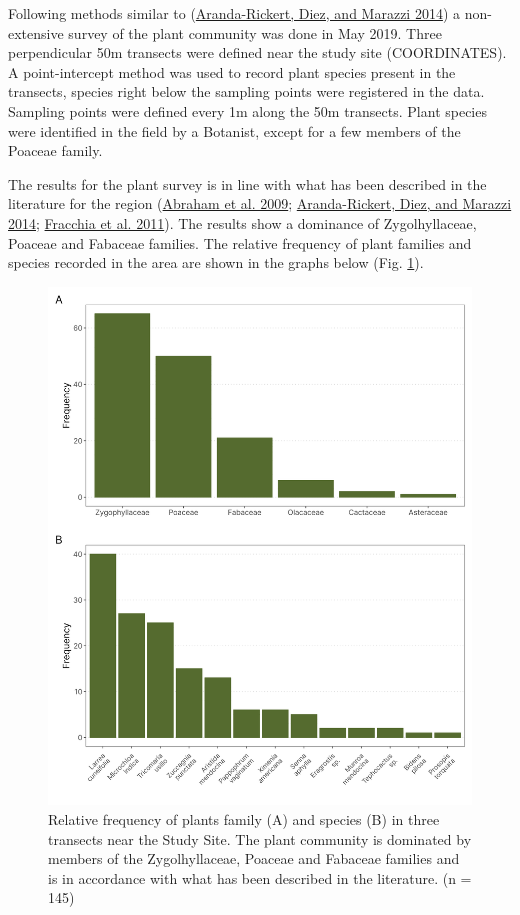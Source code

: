 \documentclass[english,msc,numbers,hidelinks]{coppe}
\begin{document}
  Following methods similar to (\protect\hyperlink{ref-aranda-rickert2014}{Aranda-Rickert, Diez, and Marazzi 2014}) a non-extensive survey of the plant community was done in May 2019. Three perpendicular 50m transects were defined near the study site (COORDINATES). A point-intercept method was used to record plant species present in the transects, species right below the sampling points were registered in the data. Sampling points were defined every 1m along the 50m transects. Plant species were identified in the field by a Botanist, except for a few members of the Poaceae family.

  The results for the plant survey is in line with what has been described in the literature for the region (\protect\hyperlink{ref-abraham2009}{Abraham et al. 2009}; \protect\hyperlink{ref-aranda-rickert2014}{Aranda-Rickert, Diez, and Marazzi 2014}; \protect\hyperlink{ref-fracchia2011}{Fracchia et al. 2011}). The results show a dominance of Zygolhyllaceae, Poaceae and Fabaceae families. The relative frequency of plant families and species recorded in the area are shown in the graphs below (Fig. \ref{fig:appendix-plants}).
  \begin{figure}

  {\centering \includegraphics[width=1\linewidth]{../04_figures/appendix/plot_plants} 

  }

  \caption{Relative frequency of plants family (A) and species (B) in three transects near the Study Site. The plant community is dominated by members of the Zygolhyllaceae, Poaceae and Fabaceae families and is in accordance with what has been described in the literature. (n = 145)}\label{fig:appendix-plants}
  \end{figure}
\end{document}
